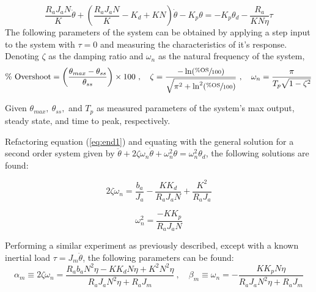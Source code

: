 \documentclass[12pt]{report}
\begin{document}
\begin{equation}
  \frac{R_aJ_aN}{K}\ddot{\theta} + \left( \frac{R_aJ_aN}{K} - K_d + KN \right)\dot{\theta} - K_p\theta = -K_p\theta_d - \frac{R_a}{KN\eta}\tau
  \label{eq:end1}
\end{equation}
\newpage
The following parameters of the system can be obtained by applying a step input to the system with $\tau=0$ and measuring the characteristics of it's response. Denoting $\zeta$ as the damping ratio and $\omega_n$ as the natural frequency of the system,
\[
  \text{\% Overshoot} = \left( \frac{\theta_{max} - \theta_{ss}}{\theta_{ss}} \right) \times 100~,\quad \zeta = \frac{-\ln(\sfrac{\%\text{OS}}{100})}{\sqrt{\pi^2 + \ln^2(\sfrac{\%\text{OS}}{100})}}~,\quad \omega_n = \frac{\pi}{T_p\sqrt{1-\zeta^2}}
\]

Given $\theta_{max},~\theta_{ss},$ and $T_p$ as measured parameters of the system's max output, steady state, and time to peak, respectively.

Refactoring equation (\ref{eq:end1}) and equating with the general solution for a second order system given by $\ddot{\theta} + 2\zeta\omega_n\dot{\theta} + \omega_n^2\theta = \omega_n^2\theta_d$, the following solutions are found:

\begin{minipage}[c]{.5\textwidth}
\begin{equation}
  2\zeta\omega_n = \frac{b_a}{J_a} - \frac{KK_d}{R_aJ_aN} + \frac{K^2}{R_aJ_a}
  \label{eq:one}
\end{equation}
\end{minipage}%
\begin{minipage}[c]{.5\textwidth}
\begin{equation}
  \omega_n^2 = \frac{-KK_p}{R_aJ_aN}
  \label{eq:two}
\end{equation}
\end{minipage}

Performing a similar experiment as previously described, except with a known inertial load $\tau = J_m\ddot{\theta}$, the following parameters can be found:
\[
  \alpha_m \equiv 2\zeta\omega_n = \frac{R_ab_aN^2\eta-KK_dN\eta+K^2N^2\eta}{R_aJ_aN^2\eta+R_aJ_m}~,\quad
  \beta_m \equiv \omega_n =-\frac{KK_pN\eta}{R_aJ_aN^2\eta+R_aJ_m}
\]
\end{document}
